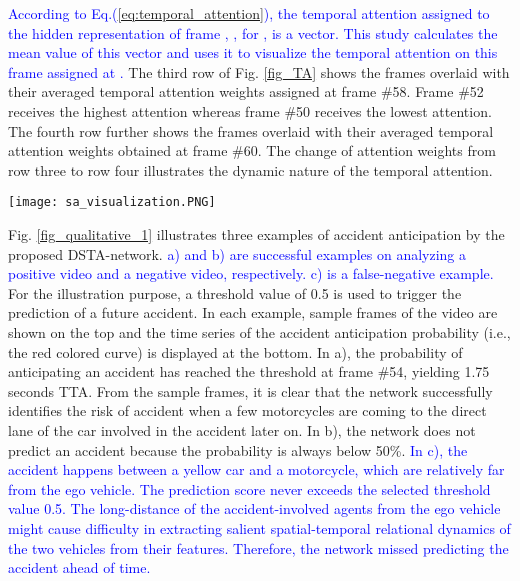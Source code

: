 \documentclass[journal]{IEEEtran}
\begin{document}
\textcolor{blue}{
According to Eq.(\ref{eq:temporal_attention}), the temporal attention assigned to the hidden representation of frame , , for ,  is a vector. This study calculates the mean value of this vector and uses it to visualize the temporal attention on this frame assigned at .} The third row of Fig. \ref{fig_TA} shows the frames overlaid with their averaged temporal attention weights assigned at frame \#58. Frame \#52 receives the highest attention whereas frame \#50 receives the lowest attention. The fourth row further shows the frames overlaid with their averaged temporal attention weights obtained at frame \#60. The change of attention weights from row three to row four illustrates the dynamic nature of the temporal attention.





\begin{figure*}[htb]
\centering
\texttt{[image: sa\_visualization.PNG]}
\caption{Illustrating the dynamics of the spatial and temporal attentions of the DSTA-network}
\label{fig_TA}
\end{figure*}


Fig. \ref{fig_qualitative_1} illustrates three examples of accident anticipation by the proposed DSTA-network. \textcolor{blue}{a) and b) are successful examples on analyzing a positive video and a negative video, respectively. c) is a false-negative example.} For the illustration purpose, a threshold value of 0.5 is used to trigger the prediction of a future accident. In each example, sample frames of the video are shown on the top and the time series of the accident anticipation probability (i.e., the red colored curve) is displayed at the bottom. In a), the probability of anticipating an accident has reached the threshold at frame \#54, yielding 1.75 seconds TTA. From the sample frames, it is clear that the network successfully identifies the risk of accident when a few motorcycles are coming to the direct lane of the car involved in the accident later on. In b), the network does not predict an accident because the probability is always below 50\%. \textcolor{blue}{In c), the accident happens between a yellow car and a motorcycle, which are relatively far from the ego vehicle. The prediction score never exceeds the selected threshold value 0.5. The long-distance of the accident-involved agents from the ego vehicle might cause difficulty in extracting salient spatial-temporal relational dynamics of the two vehicles from their features. Therefore, the network missed predicting the accident ahead of time.}
\end{document}
